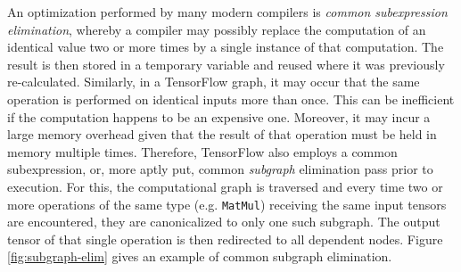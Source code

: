 An optimization performed by many modern compilers is \emph{common subexpression
  elimination}, whereby a compiler may possibly replace the computation of an
identical value two or more times by a single instance of that computation. The
result is then stored in a temporary variable and reused where it was previously
re-calculated. Similarly, in a TensorFlow graph, it may occur that the same
operation is performed on identical inputs more than once. This can be
inefficient if the computation happens to be an expensive one. Moreover, it may
incur a large memory overhead given that the result of that operation must be
held in memory multiple times. Therefore, TensorFlow also employs a common
subexpression, or, more aptly put, common \emph{subgraph} elimination pass prior
to execution. For this, the computational graph is traversed and every time two
or more operations of the same type (e.g. \texttt{MatMul}) receiving the same
input tensors are encountered, they are canonicalized to only one such
subgraph. The output tensor of that single operation is then redirected to all
dependent nodes. Figure \ref{fig:subgraph-elim} gives an example of common
subgraph elimination.

